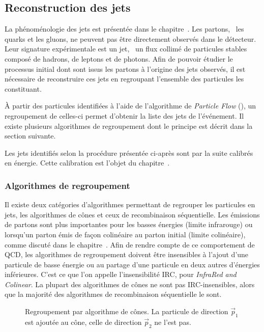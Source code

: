 \subsection{Reconstruction des jets}\label{chapter-CMS-section-jets_reco}
La phénoménologie des jets est présentée dans le chapitre~.
Les partons, \ie\ les quarks et les gluons, ne peuvent pas être directement observés dans le détecteur.
Leur signature expérimentale est un jet, \ie\ un flux collimé de particules stables composé de hadrons, de leptons et de photons.
Afin de pouvoir étudier le processus initial dont sont issus les partons à l'origine des jets observés, il est nécessaire de reconstruire ces jets en regroupant l'ensemble des particules les constituant.
\par
À partir des particules identifiées à l'aide de l'algorithme de \emph{Particle Flow} (\PF), un regroupement de celles-ci permet d'obtenir la liste des jets de l'événement.
Il existe plusieurs algorithmes de regroupement dont le principe est décrit dans la section suivante.
\par
Les jets identifiés selon la procédure présentée ci-après sont par la suite calibrés en énergie.
Cette calibration est l'objet du chapitre~.
\subsubsection{Algorithmes de regroupement}\label{chapter-CMS-section-jets_reco-subsec-algo}
Il existe deux catégories d'algorithmes permettant de regrouper les particules en jets, les algorithmes de cônes et ceux de recombinaison séquentielle.
Les émissions de partons sont plus importantes pour les basses énergies (limite infrarouge) ou lorsqu'un parton émis de façon colinéaire au parton initial (limite colinéaire), comme discuté dans le chapitre~.
Afin de rendre compte de ce comportement de QCD, les algorithmes de regroupement doivent être insensibles à l'ajout d'une particule de basse énergie ou au partage d'une particule en deux autres d'énergies inférieures. C'est ce que l'on appelle l'insensibilité IRC, pour \emph{InfraRed and Colinear}.
La plupart des algorithmes de cônes ne sont pas IRC-insensibles, alors que la majorité des algorithmes de recombinaison séquentielle le sont.
\begin{wrapfigure}{R}{.45\textwidth}
\centering
{}
\caption[Regroupement par algorithme de cônes.]{Regroupement par algorithme de cônes. La particule de direction $\vec{p}_1$ est ajoutée au cône, celle de direction $\vec{p}_2$ ne l'est pas.}
\label{fig-schema_algo_cones}
\end{wrapfigure}
